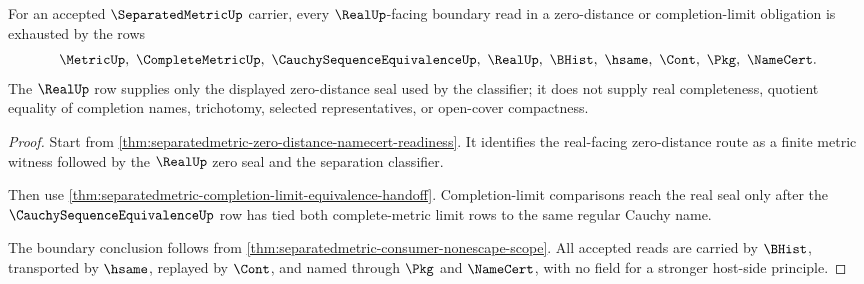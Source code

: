 \begin{theorem}
\label{thm:separatedmetric-real-seal-boundary-obligations}
For an accepted $\SeparatedMetricUp$ carrier, every $\RealUp$-facing boundary read in a zero-distance or completion-limit obligation is exhausted by the rows
$$
\MetricUp,\ \CompleteMetricUp,\ \CauchySequenceEquivalenceUp,\ \RealUp,\ \BHist,\ \hsame,\ \Cont,\ \Pkg,\ \NameCert .
$$
The $\RealUp$ row supplies only the displayed zero-distance seal used by the classifier; it does not supply real completeness, quotient equality of completion names, trichotomy, selected representatives, or open-cover compactness.
\end{theorem}
\begin{proof}
Start from \autoref{thm:separatedmetric-zero-distance-namecert-readiness}. It identifies the real-facing zero-distance route as a finite metric witness followed by the $\RealUp$ zero seal and the separation classifier.

Then use \autoref{thm:separatedmetric-completion-limit-equivalence-handoff}. Completion-limit comparisons reach the real seal only after the $\CauchySequenceEquivalenceUp$ row has tied both complete-metric limit rows to the same regular Cauchy name.

The boundary conclusion follows from \autoref{thm:separatedmetric-consumer-nonescape-scope}. All accepted reads are carried by $\BHist$, transported by $\hsame$, replayed by $\Cont$, and named through $\Pkg$ and $\NameCert$, with no field for a stronger host-side principle.
\end{proof}

